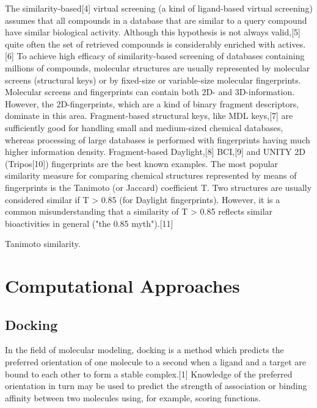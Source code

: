 The similarity-based[4] virtual screening (a kind of ligand-based virtual screening) assumes that all compounds in a database that are similar to a query compound have similar biological activity. Although this hypothesis is not always valid,[5] quite often the set of retrieved compounds is considerably enriched with actives.[6] To achieve high efficacy of similarity-based screening of databases containing millions of compounds, molecular structures are usually represented by molecular screens (structural keys) or by fixed-size or variable-size molecular fingerprints. Molecular screens and fingerprints can contain both 2D- and 3D-information. However, the 2D-fingerprints, which are a kind of binary fragment descriptors, dominate in this area. Fragment-based structural keys, like MDL keys,[7] are sufficiently good for handling small and medium-sized chemical databases, whereas processing of large databases is performed with fingerprints having much higher information density. Fragment-based Daylight,[8] BCI,[9] and UNITY 2D (Tripos[10]) fingerprints are the best known examples. The most popular similarity measure for comparing chemical structures represented by means of fingerprints is the Tanimoto (or Jaccard) coefficient T. Two structures are usually considered similar if T > 0.85 (for Daylight fingerprints). However, it is a common misunderstanding that a similarity of T > 0.85 reflects similar bioactivities in general ("the 0.85 myth").[11]

Tanimoto similarity.

\section{Computational Approaches}

\subsection{Docking}

In the field of molecular modeling, docking is a method which predicts the preferred orientation of one molecule to a second when a ligand and a target are bound to each other to form a stable complex.[1] Knowledge of the preferred orientation in turn may be used to predict the strength of association or binding affinity between two molecules using, for example, scoring functions.

